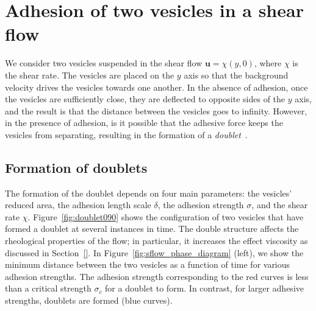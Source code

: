 \documentclass[%
preprint,
 amsmath,amssymb,
 aps,
]{revtex4-1}
\newcommand{\uu}{\mathbf{u}}
\begin{document}
\section{Adhesion of two vesicles in a shear flow}
\label{sec:sflow} 
We consider two vesicles suspended in the shear flow $\uu = \chi(y,0)$,
where $\chi$ is the shear rate.  The vesicles are placed on the $y$ axis
so that the background velocity drives the vesicles towards one another.
In the absence of adhesion, once the vesicles are sufficiently close,
they are deflected to opposite sides of the $y$ axis, and the result is
that the distance between the vesicles goes to infinity.  However, in
the presence of adhesion, is it possible that the adhesive force keeps
the vesicles from separating, resulting in the formation of a {\em
doublet}~\cite{}.



\subsection{Formation of doublets}
\label{sec:sflow_doublet_formation} 
The formation of the doublet depends on four main parameters: the
vesicles' reduced area, the adhesion length scale $\delta$, the adhesion
strength $\sigma$, and the shear rate $\chi$.
Figure~\ref{fig:doublet090} shows the configuration of two vesicles that
have formed a doublet at several instances in time.  The double
structure affects the rheological properties of the flow; in particular,
it increases the effect viscosity as discussed in Section~\ref{}.  In
Figure~\ref{fig:sflow_phase_diagram} (left), we show the minimum
distance between the two vesicles as a function of time for various
adhesion strengths.  The adhesion strength corresponding to the red
curves is less than a critical strength $\sigma_c$ for a doublet to
form.  In contrast, for larger adhesive strengths, doublets are formed
(blue curves).
\end{document}
